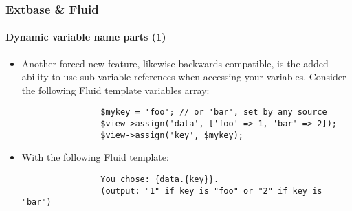 \begin{frame}[fragile]
	\frametitle{Extbase \& Fluid}
	\framesubtitle{Dynamic variable name parts (1)}

	\lstset{basicstyle=\tiny\ttfamily}

	\begin{itemize}

		\item Another forced new feature, likewise backwards compatible, is the added
			ability to use sub-variable references when accessing your variables.
			Consider the following Fluid template variables array:

			\begin{lstlisting}
				$mykey = 'foo'; // or 'bar', set by any source
				$view->assign('data', ['foo' => 1, 'bar' => 2]);
				$view->assign('key', $mykey);
			\end{lstlisting}

		\item With the following Fluid template:

			\begin{lstlisting}
				You chose: {data.{key}}.
				(output: "1" if key is "foo" or "2" if key is "bar")
			\end{lstlisting}

	\end{itemize}

\end{frame}


